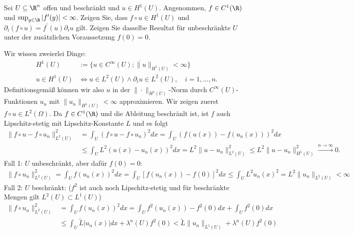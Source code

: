 
\begin{exercise}

Sei $U \subseteq \R^n$ offen und beschränkt und $u \in H^1(U)$.
Angenommen, $f \in C^1(\R)$ und $\sup_{y \in \R} |f^\prime(y)| < \infty$. Zeigen Sie, dass $f \circ u \in H^1(U)$ und $\partial_i(f \circ u) = f^\prime(u) \partial_i u$ gilt.
Zeigen Sie dasselbe Resultat für unbeschränkte $U$ unter der zusätzlichen Voraussetzung $f(0) = 0$.

\end{exercise}


\begin{solution}
Wir wissen zweierlei Dinge:
\begin{align*}
  H^1(U) &:= \overline{\{u \in C^{\infty}(U); \|u\|_{H^1(U)} < \infty\}} \\
  u \in H^1(U) &\iff u \in L^2(U) \land \partial_i u \in L^2(U), \quad i=1,\dots,n.
\end{align*}
Definitionsgemäß können wir also $u$ in der $\|\cdot\|_{H^1(U)}$-Norm durch
$C^{\infty}(U)$-Funktionen $u_n$ mit $\|u_n\|_{H^1(U)} < \infty$ approximieren.
Wir zeigen zuerst $f \circ u \in L^2(\Omega)$. Da $f \in C^1(\R)$ und die Ableitung
beschränlt ist, ist $f$ auch Lipschitz-stetig mit Lipschitz-Konstante $L$ und es folgt
\begin{align*}
  \|f\circ u - f\circ u_n\|_{L^2(U)}^2 &= \int_U (f \circ u - f\circ u_n)^2 dx
  = \int_U (f(u(x))- f(u_n(x)))^2 dx \\
  &\leq \int_U L^2(u(x) - u_n(x))^2 dx = L^2\|u - u_n\|_{L^2(U)}^2
  \leq L^2\|u - u_n\|_{H^1(U)}^2  \xrightarrow{n \to \infty} 0.
\end{align*}
Fall 1: $U$ unbeschränkt, aber dafür $f(0) = 0$:
\begin{align*}
  \|f\circ u_n\|_{L^2(U)}^2 = \int_U f(u_n(x))^2dx = \int_U [f(u_n(x)) - f(0)]^2 dx
  \leq \int_U L^2u_n(x)^2 = L^2\|u_n\|_{L^2(U)} < \infty
\end{align*}
Fall 2: $U$ beschränkt: ($f^2$ ist auch noch Lipschitz-stetig und für beschränkte Mengen
gilt $L^2(U) \subset L^1(U)$)
\begin{align*}
  \|f\circ u_n\|_{L^2(U)}^2 &= \int_U f(u_n(x))^2dx = \int_U f^2(u_n(x)) - f^2(0) dx + \int_U f^2(0) dx \\
  &\leq \int_U \tilde{L}|u_n(x)| dx + \lambda^n(U)f^2(0) < \tilde{L}\|u_n\|_{L^1(U)} + \lambda^n(U)f^2(0)

\end{align*}
\end{solution}
